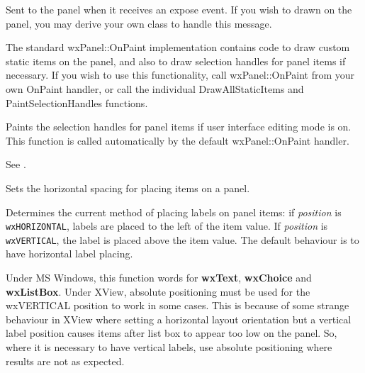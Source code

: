 

Sent to the panel when it receives an expose event. If you wish to drawn
on the panel, you may derive your own class to handle this message.

The standard wxPanel::OnPaint implementation contains code to draw
custom static items on the panel, and also to draw selection
handles for panel items if necessary. If you wish to use this functionality,
call wxPanel::OnPaint from your own OnPaint handler, or call
the individual DrawAllStaticItems and PaintSelectionHandles functions.



Paints the selection handles for panel items if user
interface editing mode is on. This function is
called automatically by the default wxPanel::OnPaint handler.

See .



Sets the horizontal spacing for placing items on a panel.



Determines the current method of placing labels on panel items: if {\it
position} is {\tt wxHORIZONTAL}, labels are placed to the left of the
item value. If {\it position} is {\tt wxVERTICAL}, the label is placed
above the item value. The default behaviour is to have horizontal label
placing.

Under MS Windows, this function words for {\bf wxText}, {\bf wxChoice}\rtfsp
and {\bf wxListBox}. Under XView, absolute positioning must be used
for the wxVERTICAL position to work in some cases. This is because of
some strange behaviour in XView where setting a horizontal layout
orientation but a vertical label position causes items after list box
to appear too low on the panel. So, where it is necessary to have
vertical labels, use absolute positioning where results are not as
expected.



